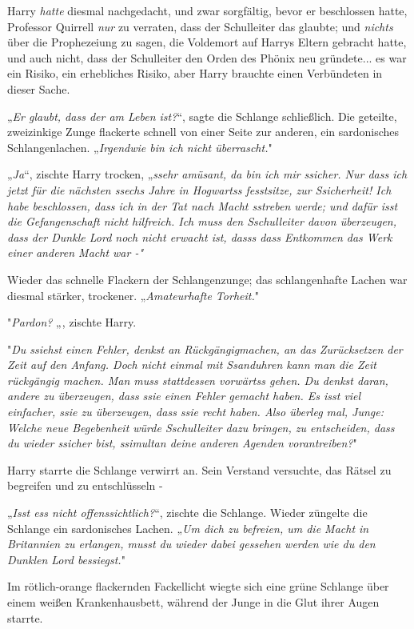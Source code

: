{Harry \emph{hatte} diesmal nachgedacht, und zwar sorgfältig, bevor er beschlossen hatte, Professor Quirrell \emph{nur} zu verraten, dass der Schulleiter das glaubte; und \emph{nichts} über die Prophezeiung zu sagen, die Voldemort auf Harrys Eltern gebracht hatte, und auch nicht, dass der Schulleiter den Orden des Phönix neu gründete... es war ein Risiko, ein erhebliches Risiko, aber Harry brauchte einen Verbündeten in dieser Sache.

„\emph{Er glaubt, dass der am Leben ist?}“, sagte die Schlange schließlich. Die geteilte, zweizinkige Zunge flackerte schnell von einer Seite zur anderen, ein sardonisches Schlangenlachen. „\emph{Irgendwie bin ich nicht überrascht.}"

„\emph{Ja}“, zischte Harry trocken, „\emph{ssehr amüsant, da bin ich mir ssicher. Nur dass ich jetzt für die nächsten ssechs Jahre in Hogwartss fesstsitze, zur Ssicherheit! Ich habe beschlossen, dass ich in der Tat nach Macht sstreben werde; und dafür isst die Gefangenschaft nicht hilfreich. Ich muss den Sschulleiter davon überzeugen, dass der Dunkle Lord noch nicht erwacht ist, dasss dass Entkommen das Werk einer anderen Macht war -"}

Wieder das schnelle Flackern der Schlangenzunge; das schlangenhafte Lachen war diesmal stärker, trockener. „\emph{Amateurhafte Torheit.}"

"\emph{Pardon?} „, zischte Harry.

"\emph{Du ssiehst einen Fehler, denkst an Rückgängigmachen, an das Zurücksetzen der Zeit auf den Anfang. Doch nicht einmal mit Ssanduhren kann man die Zeit rückgängig machen. Man muss stattdessen vorwärtss gehen. Du denkst daran, andere zu überzeugen, dass ssie einen Fehler gemacht haben. Es isst viel einfacher, ssie zu überzeugen, dass ssie recht haben. Also überleg mal, Junge: Welche neue Begebenheit würde Sschulleiter dazu bringen, zu entscheiden, dass du wieder ssicher bist, ssimultan deine anderen Agenden vorantreiben?}"

Harry starrte die Schlange verwirrt an. Sein Verstand versuchte, das Rätsel zu begreifen und zu entschlüsseln -

„\emph{Isst ess nicht offenssichtlich?}“, zischte die Schlange. Wieder züngelte die Schlange ein sardonisches Lachen. „\emph{Um dich zu befreien, um die Macht in Britannien zu erlangen, musst du wieder dabei gessehen werden wie du den Dunklen Lord bessiegst.}"

Im rötlich-orange flackernden Fackellicht wiegte sich eine grüne Schlange über einem weißen Krankenhausbett, während der Junge in die Glut ihrer Augen starrte.

}
